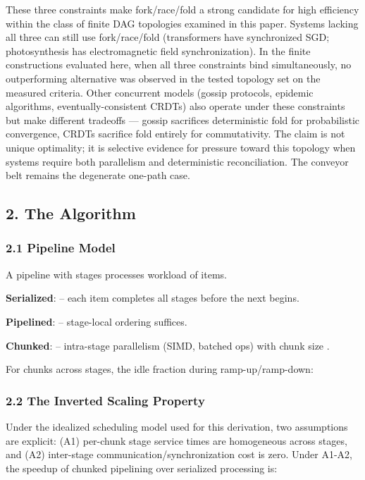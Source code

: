 \documentclass[
]{article}
\begin{document}
These three constraints make fork/race/fold a strong candidate for high
efficiency within the class of finite DAG topologies examined in this
paper. Systems lacking all three can still use fork/race/fold
(transformers have synchronized SGD; photosynthesis has electromagnetic
field synchronization). In the finite constructions evaluated here, when
all three constraints bind simultaneously, no outperforming alternative
was observed in the tested topology set on the measured criteria. Other
concurrent models (gossip protocols, epidemic algorithms,
eventually-consistent CRDTs) also operate under these constraints but
make different tradeoffs --- gossip sacrifices deterministic fold for
probabilistic convergence, CRDTs sacrifice fold entirely for
commutativity. The claim is not unique optimality; it is selective
evidence for pressure toward this topology when systems require both
parallelism and deterministic reconciliation. The conveyor belt remains
the degenerate one-path case.

\subsection{\texorpdfstring{\textbf{2. The
Algorithm}}{2. The Algorithm}}\label{the-algorithm}

\subsubsection{\texorpdfstring{\textbf{2.1 Pipeline
Model}}{2.1 Pipeline Model}}\label{pipeline-model}

A pipeline with stages processes workload of items.

\textbf{Serialized}: -- each item completes all stages before the next
begins.

\textbf{Pipelined}: -- stage-local ordering suffices.

\textbf{Chunked}: -- intra-stage parallelism (SIMD, batched ops) with
chunk size .

For chunks across stages, the idle fraction during ramp-up/ramp-down:

\subsubsection{\texorpdfstring{\textbf{2.2 The Inverted Scaling
Property}}{2.2 The Inverted Scaling Property}}\label{the-inverted-scaling-property}

Under the idealized scheduling model used for this derivation, two
assumptions are explicit: (A1) per-chunk stage service times are
homogeneous across stages, and (A2) inter-stage
communication/synchronization cost is zero. Under A1-A2, the speedup of
chunked pipelining over serialized processing is:
\end{document}
